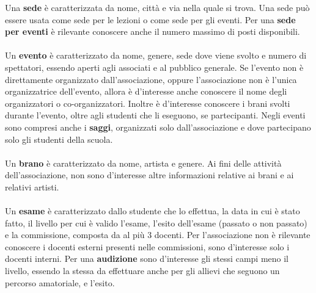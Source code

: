 \documentclass[12pt]{article}
\begin{document}
	Una \textbf{sede} è caratterizzata da nome, città e via nella quale si trova. Una sede può essere usata come sede per le lezioni o come sede per gli eventi. Per una \textbf{sede per eventi} è rilevante conoscere anche il numero massimo di posti disponibili.\\\\
	Un \textbf{evento} è caratterizzato da nome, genere, sede dove viene svolto e numero di spettatori, essendo aperti agli associati e al pubblico generale. Se l'evento non è direttamente organizzato dall'associazione, oppure l'associazione non è l'unica organizzatrice dell'evento, allora è d'interesse anche conoscere il nome degli organizzatori o co-organizzatori. Inoltre è d'interesse conoscere i brani svolti durante l'evento, oltre agli studenti che li eseguono, se partecipanti. Negli eventi sono compresi anche i \textbf{saggi}, organizzati solo dall'associazione e dove partecipano solo gli studenti della scuola.\\\\
	Un \textbf{brano} è caratterizzato da nome, artista e genere. Ai fini delle attività dell'associazione, non sono d'interesse altre informazioni relative ai brani e ai relativi artisti.\\\\
	Un \textbf{esame} è caratterizzato dallo studente che lo effettua, la data in cui è stato fatto, il livello per cui è valido l'esame, l'esito dell'esame (passato o non passato) e la commissione, composta da al più 3 docenti. Per l'associazione non è rilevante conoscere i docenti esterni presenti nelle commissioni, sono d'interesse solo i docenti interni. Per una \textbf{audizione} sono d'interesse gli stessi campi meno il livello, essendo la stessa da effettuare anche per gli allievi che seguono un percorso amatoriale, e l'esito.
\end{document}
